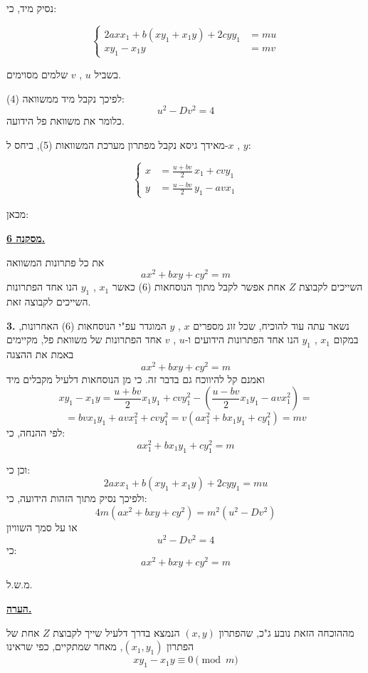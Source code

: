 \noindent נסיק מיד, כי:

\[ \left\{ \begin{aligned} 2axx_1 + b(xy_1+x_1y) + 2cyy_1 &= mu \\ xy_1 - x_1y &= mv \end{aligned} \right. \tag{5} \]

\noindent בשביל $u$ , $v$ שלמים מסוימים.

\noindent לפיכך נקבל מיד ממשוואה (4):
\[ u^2 - Dv^2 = 4 \]
\noindent כלומר את משוואת פל הידועה.

\noindent מאידך גיסא נקבל מפתרון מערכת המשוואות (5), ביחס ל-$x$ , $y$:

\[ \left\{ \begin{aligned} x &= \frac{u+bv}{2}\,x_1 + cvy_1 \\ y &= \frac{u-bv}{2}\,y_1 - avx_1 \end{aligned} \right. \tag{6} \]

\noindent מכאן:

\bigskip
\noindent\textbf{\underline{מסקנה 6.}}

\noindent את כל פתרונות המשוואה
\[ ax^2 + bxy + cy^2 = m \]
\noindent השייכים לקבוצת $Z$ אחת אפשר לקבל מתוך הנוסחאות (6) כאשר $x_1$ , $y_1$ הנו אחד הפתרונות השייכים לקבוצה זאת.

\bigskip
\noindent\textbf{3.} נשאר עתה עוד להוכיח, שכל זוג מספרים $x$ , $y$ המוגדר עפ"י הנוסחאות (6) האחרונות, במקום $x_1$ , $y_1$ הנו אחד הפתרונות הידועים ו-$u$ , $v$ אחד הפתרונות של משוואת פל, מקיימים באמת את ההצגה
\[ ax^2 + bxy + cy^2 = m \]
\noindent ואמנם קל להיווכח גם בדבר זה. כי מן הנוסחאות דלעיל מקבלים מיד
\[ xy_1 - x_1y = \frac{u+bv}{2}x_1y_1 + cvy_1^2 - \left(\frac{u-bv}{2}x_1y_1 - avx_1^2\right) = \]
\[ = bvx_1y_1 + avx_1^2 + cvy_1^2 = v(ax_1^2+bx_1y_1+cy_1^2) = mv \tag{1} \]
\noindent לפי ההנחה, כי:
\[ ax_1^2 + bx_1y_1 + cy_1^2 = m \]

\noindent וכן כי:
\[ 2axx_1 + b(xy_1+x_1y) + 2cyy_1 = mu \]
\noindent ולפיכך נסיק מתוך הזהות הידועה, כי:
\[ 4m(ax^2+bxy+cy^2) = m^2(u^2-Dv^2) \]
\noindent או על סמך השוויון
\[ u^2 - Dv^2 = 4 \]
\noindent כי:
\[ ax^2 + bxy + cy^2 = m \]

\medskip
\hfill מ.ש.ל.

\bigskip
\noindent\textbf{\underline{הערה.}}

\noindent מההוכחה הזאת נובע ג"כ, שהפתרון $(x,y)$ הנמצא בדרך דלעיל שייך לקבוצת $Z$ אחת של הפתרון $(x_1,y_1)$, מאחר שמתקיים, כפי שראינו
\[ xy_1 - x_1y \equiv 0 \pmod{m} \]

